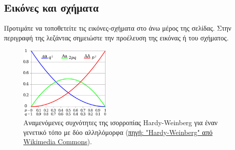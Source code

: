 \begin{refsection}
\subsection{Εικόνες και σχήματα}
Προτιμάτε να τοποθετείτε τις εικόνες-σχήματα στο άνω μέρος της σελίδας. Στην περιγραφή της λεζάντας
σημειώστε την προέλευση της εικόνας ή του σχήματος.
\begin{figure}[t]
\renewcommand{\figurename}{Εικόνα}
\centering
\includegraphics[width=0.4\textwidth]{images/img_7_1.png}
\caption[Αναπαράσταση ισορροπίας Hardy-Weinberg]{Αναμενόμενες συχνότητες της ισορροπίας Hardy-Weinberg για έναν γενετικό τόπο με δύο αλληλόμορφα (\href {https://commons.wikimedia.org/wiki/File:Hardy-Weinberg.svg\#/media/File:Hardy-Weinberg.svg}{πηγή: "Hardy-Weinberg" από Wikimedia Commons}).}
\label{figure:img_7_1}
\end{figure}


\end{refsection}
